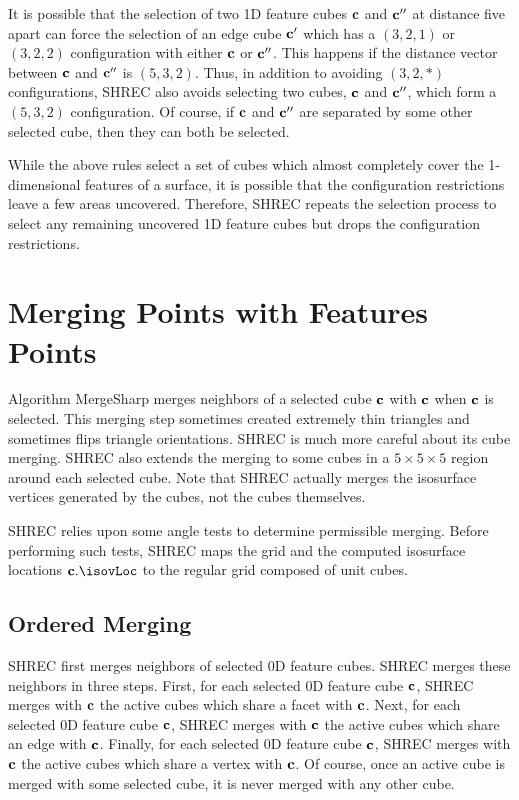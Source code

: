 It is possible that the selection of two 1D feature cubes $\mathbf{c}$ and $\mathbf{c}''$
at distance five apart can force the selection of an edge cube $\mathbf{c}'$
which has a $(3,2,1)$ or $(3,2,2)$ configuration 
with either $\mathbf{c}$ or $\mathbf{c}''$.
This happens if the distance vector between $\mathbf{c}$ and $\mathbf{c}''$
is $(5,3,2)$.
Thus, in addition to avoiding $(3,2,*)$ configurations,
SHREC also avoids selecting two cubes, $\mathbf{c}$ and $\mathbf{c}''$, 
which form a $(5,3,2)$ configuration.
Of course, if $\mathbf{c}$ and $\mathbf{c}''$ are separated by some other selected cube,
then they can both be selected.

While the above rules select a set of cubes which almost completely cover
the 1-dimensional features of a surface,
it is possible that the configuration restrictions leave a few areas uncovered.
Therefore, SHREC repeats the selection process to select any remaining
uncovered 1D feature cubes but drops the configuration restrictions.


\section{Merging Points with Features Points}
\label{section:merging}

Algorithm MergeSharp merges neighbors of a selected cube $\mathbf{c}$ 
with $\mathbf{c}$ when $\mathbf{c}$ is selected.
This merging step sometimes created extremely thin triangles and 
sometimes flips triangle orientations.
SHREC is much more careful about its cube merging.
SHREC also extends the merging to some cubes in a $5 \times 5 \times 5$ region 
around each selected cube.
Note that SHREC actually merges the isosurface vertices generated by the cubes,
not the cubes themselves.

SHREC relies upon some angle tests to determine permissible merging.
Before performing such tests, SHREC maps the grid 
and the computed isosurface locations $\cb.\isovLoc$
to the regular grid composed of unit cubes.

\subsection{Ordered Merging}
\label{section:ordered_merging}

SHREC first merges neighbors of selected 0D feature cubes.
SHREC merges these neighbors in three steps.
First, for each selected 0D feature cube $\mathbf{c}$,
SHREC merges with $\mathbf{c}$ the active cubes which share a facet with $\mathbf{c}$.
Next, for each selected 0D feature cube $\mathbf{c}$,
SHREC merges with $\mathbf{c}$ the active cubes which share an edge with $\mathbf{c}$.
Finally, for each selected 0D feature cube $\mathbf{c}$,
SHREC merges with $\mathbf{c}$ the active cubes which share a vertex with $\mathbf{c}$.
Of course, once an active cube is merged with some selected cube,
it is never merged with any other cube.

